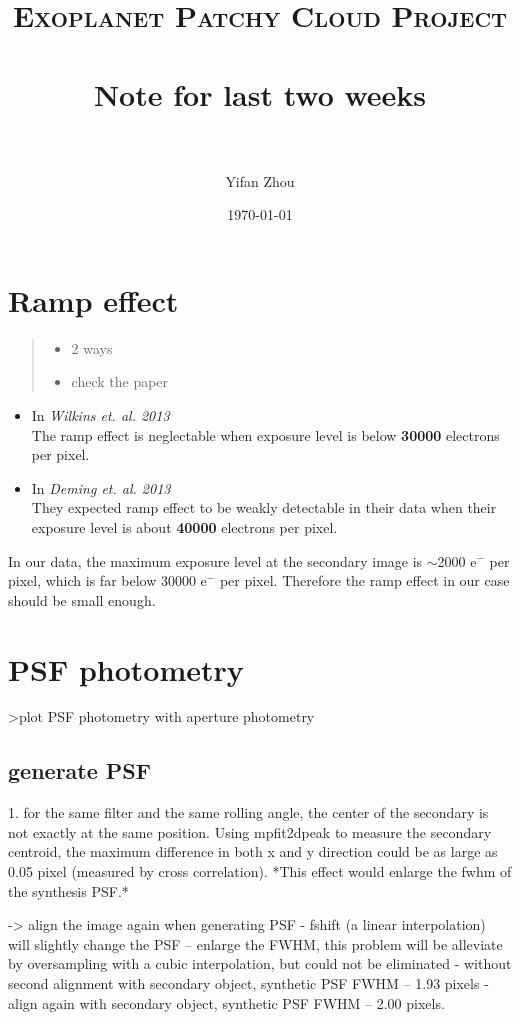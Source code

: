 \documentclass[paper=letter, fontsize=11pt]{scrartcl} %
\title{ 
\normalfont \normalsize 
\textsc{Exoplanet Patchy Cloud Project} \\ [25pt] %
\horrule{0.5pt} \\[0.4cm] %
\huge Note for last two weeks\\ %
\horrule{2pt} \\[0.5cm] %
}
\author{Yifan Zhou} %
\date{\normalsize\today} %
\numberwithin{equation}{section} %
\numberwithin{figure}{section} %
\numberwithin{table}{section} %
\begin{document}
\maketitle %
\section{Ramp effect}
\begin{quote}
  \begin{itemize}
\item 2 ways
\item check the paper
 \end{itemize}
\end{quote}

\begin{itemize}
\item  In \textsl{Wilkins et. al. 2013}\\

    The ramp effect is neglectable when exposure level is below \textbf{30000} electrons per pixel.

\item In \textsl{Deming et. al. 2013}\\

    They expected ramp effect to be weakly detectable in their data
    when their exposure level is about \textbf{40000} electrons per pixel.
\end{itemize}

 In our data, the maximum exposure level at the secondary image is $\sim$2000 e$^-$ per pixel, which is far below 30000 e$^-$ per pixel. Therefore the ramp effect in our case should be small enough.

\section{ PSF photometry}
>plot PSF photometry with aperture photometry

\subsection{ generate PSF}
1. for the same filter and the same rolling angle, the center of the secondary is not exactly at the same position. Using mpfit2dpeak to measure the secondary centroid, the maximum difference in both x and y direction could be as large as 0.05 pixel (measured by cross correlation). *This effect would enlarge the  fwhm of the synthesis PSF.*

-> align the image again when generating PSF
- fshift (a linear interpolation) will slightly change the PSF -- enlarge the FWHM, this problem will be alleviate by oversampling with a cubic interpolation, but could not be eliminated
- without second alignment with secondary object, synthetic PSF FWHM -- 1.93 pixels
- align again with secondary object, synthetic PSF FWHM -- 2.00 pixels.
\end{document}
